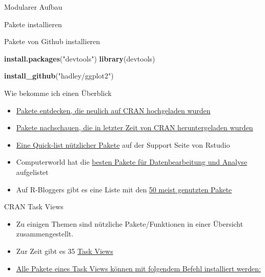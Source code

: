 \documentclass[ignorenonframetext,]{beamer}
\newenvironment{Shaded}{}{}
\newcommand{\KeywordTok}[1]{\textcolor[rgb]{0.00,0.44,0.13}{\textbf{{#1}}}}
\newcommand{\StringTok}[1]{\textcolor[rgb]{0.25,0.44,0.63}{{#1}}}
\newcommand{\NormalTok}[1]{{#1}}
\begin{document}
\begin{frame}[fragile]{Modularer Aufbau}
\begin{block}{Pakete installieren}
\begin{block}{Pakete von Github installieren}

\begin{Shaded}
\begin{Highlighting}[]
\KeywordTok{install.packages}\NormalTok{(}\StringTok{"devtools"}\NormalTok{)}
\KeywordTok{library}\NormalTok{(devtools)}

\KeywordTok{install_github}\NormalTok{(}\StringTok{"hadley/ggplot2"}\NormalTok{)}
\end{Highlighting}
\end{Shaded}

\end{block}

\end{block}

\begin{block}{Wie bekomme ich einen Überblick}

\begin{itemize}
\item
  \href{https://mran.microsoft.com/packages/}{Pakete entdecken, die
  neulich auf CRAN hochgeladen wurden}
\item
  \href{https://gallery.shinyapps.io/cran-gauge/}{Pakete nachschauen,
  die in letzter Zeit von CRAN heruntergeladen wurden}
\item
  \href{https://support.rstudio.com/hc/en-us/articles/201057987-Quick-list-of-useful-R-packages}{Eine
  Quick-list nützlicher Pakete} auf der Support Seite von Rstudio
\item
  Computerworld hat die
  \href{http://www.computerworld.com/article/2921176/business-intelligence/great-r-packages-for-data-import-wrangling-visualization.html}{besten
  Pakete für Datenbearbeitung und Analyse} aufgelistet
\item
  Auf R-Bloggers gibt es eine Liste mit den
  \href{https://www.r-bloggers.com/the-50-most-used-r-packages/}{50
  meist genutzten Pakete}
\end{itemize}

\end{block}

\begin{block}{CRAN Task Views}

\begin{itemize}
\item
  Zu einigen Themen sind nützliche Pakete/Funktionen in einer Übersicht
  zusammengestellt.
\item
  Zur Zeit gibt es 35 \href{https://cran.r-project.org/web/views/}{Task
  Views}
\item
  \href{https://mran.microsoft.com/rpackages/}{Alle Pakete eines Task
  Views können mit folgendem Befehl installiert werden:}
\end{itemize}


\end{block}
\end{frame}
\end{document}
